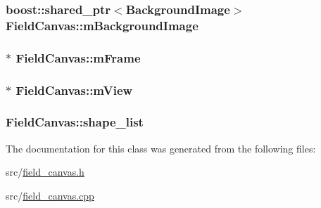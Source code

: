 \hypertarget{a00101_ad2471426f32f860c684282a7d46e36db}{
\subsubsection[{m\-Background\-Image}]{\setlength{\rightskip}{0pt plus 5cm}boost\-::shared\-\_\-ptr$<${\bf Background\-Image}$>$ Field\-Canvas\-::m\-Background\-Image\hspace{0.3cm}{\ttfamily [private]}}}\label{a00101_ad2471426f32f860c684282a7d46e36db}
\hypertarget{a00101_a4eb19251de05b63c1d024907670b97a3}{
\subsubsection[{m\-Frame}]{$\ast$ Field\-Canvas\-::m\-Frame\hspace{0.3cm}{\ttfamily [private]}}}\label{a00101_a4eb19251de05b63c1d024907670b97a3}
\hypertarget{a00101_a8708bee382612444a5e4472f50b848bf}{
\subsubsection[{m\-View}]{$\ast$ Field\-Canvas\-::m\-View\hspace{0.3cm}{\ttfamily [private]}}}\label{a00101_a8708bee382612444a5e4472f50b848bf}
\hypertarget{a00101_a7560c79cbde29e0719d7aa2949b076f4}{
\subsubsection[{shape\-\_\-list}]{ Field\-Canvas\-::shape\-\_\-list\hspace{0.3cm}{\ttfamily [private]}}}\label{a00101_a7560c79cbde29e0719d7aa2949b076f4}


The documentation for this class was generated from the following files\-:\begin{DoxyCompactItemize}
\item 
src/\hyperlink{a00225}{field\-\_\-canvas.\-h}\item 
src/\hyperlink{a00224}{field\-\_\-canvas.\-cpp}\end{DoxyCompactItemize}
